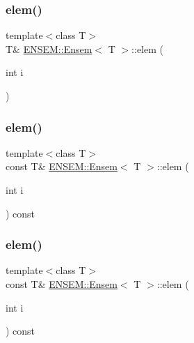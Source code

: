 \mbox{\label{classENSEM_1_1Ensem_a4927ebde99b1f0a03cdcfe3fc88458a5}} 
\subsubsection{\texorpdfstring{elem()}{elem()}\hspace{0.1cm}{\footnotesize\ttfamily [3/6]}}
{\footnotesize\ttfamily template$<$class T$>$ \\
T\& \mbox{\hyperlink{classENSEM_1_1Ensem}{E\+N\+S\+E\+M\+::\+Ensem}}$<$ T $>$\+::elem (\begin{DoxyParamCaption}\item[{int}]{i }\end{DoxyParamCaption})\hspace{0.3cm}{\ttfamily [inline]}}

\mbox{\label{classENSEM_1_1Ensem_a03e45aba3d9addb16e117debbc4e1a33}} 
\subsubsection{\texorpdfstring{elem()}{elem()}\hspace{0.1cm}{\footnotesize\ttfamily [4/6]}}
{\footnotesize\ttfamily template$<$class T$>$ \\
const T\& \mbox{\hyperlink{classENSEM_1_1Ensem}{E\+N\+S\+E\+M\+::\+Ensem}}$<$ T $>$\+::elem (\begin{DoxyParamCaption}\item[{int}]{i }\end{DoxyParamCaption}) const\hspace{0.3cm}{\ttfamily [inline]}}

\mbox{\label{classENSEM_1_1Ensem_a03e45aba3d9addb16e117debbc4e1a33}} 
\subsubsection{\texorpdfstring{elem()}{elem()}\hspace{0.1cm}{\footnotesize\ttfamily [5/6]}}
{\footnotesize\ttfamily template$<$class T$>$ \\
const T\& \mbox{\hyperlink{classENSEM_1_1Ensem}{E\+N\+S\+E\+M\+::\+Ensem}}$<$ T $>$\+::elem (\begin{DoxyParamCaption}\item[{int}]{i }\end{DoxyParamCaption}) const\hspace{0.3cm}{\ttfamily [inline]}}

